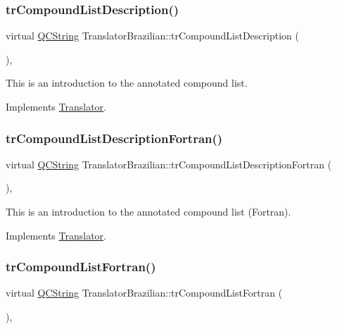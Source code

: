 \subsubsection{\texorpdfstring{trCompoundListDescription()}{trCompoundListDescription()}}
{\footnotesize\ttfamily virtual \mbox{\hyperlink{class_q_c_string}{Q\+C\+String}} Translator\+Brazilian\+::tr\+Compound\+List\+Description (\begin{DoxyParamCaption}{ }\end{DoxyParamCaption})\hspace{0.3cm}{\ttfamily [inline]}, {\ttfamily [virtual]}}

This is an introduction to the annotated compound list. 

Implements \mbox{\hyperlink{class_translator}{Translator}}.

\mbox{\label{class_translator_brazilian_ae9a2204cd17ac2c5a5cc7bf2e4061c67}} 
\subsubsection{\texorpdfstring{trCompoundListDescriptionFortran()}{trCompoundListDescriptionFortran()}}
{\footnotesize\ttfamily virtual \mbox{\hyperlink{class_q_c_string}{Q\+C\+String}} Translator\+Brazilian\+::tr\+Compound\+List\+Description\+Fortran (\begin{DoxyParamCaption}{ }\end{DoxyParamCaption})\hspace{0.3cm}{\ttfamily [inline]}, {\ttfamily [virtual]}}

This is an introduction to the annotated compound list (Fortran). 

Implements \mbox{\hyperlink{class_translator}{Translator}}.

\mbox{\label{class_translator_brazilian_ab9641535d93b2466a272ace7e85d4a3a}} 
\subsubsection{\texorpdfstring{trCompoundListFortran()}{trCompoundListFortran()}}
{\footnotesize\ttfamily virtual \mbox{\hyperlink{class_q_c_string}{Q\+C\+String}} Translator\+Brazilian\+::tr\+Compound\+List\+Fortran (\begin{DoxyParamCaption}{ }\end{DoxyParamCaption})\hspace{0.3cm}{\ttfamily [inline]}, {\ttfamily [virtual]}}

